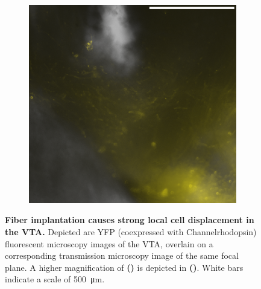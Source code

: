 \begin{figure}[h!]
	\begin{subfigure}{.2728\textwidth}
		\centering
		\includegraphics[width=\textwidth]{img/sub-6589_slice-a4_zoom-10_scene-2_transmission-yfp-comb_straight.png}
                \caption{}
		\label{fig:h6589z}
	\end{subfigure}
        \vspace{-.5em}
	\caption{
		\textbf{Fiber implantation causes strong local cell displacement in the VTA.}
                Depicted are YFP (coexpressed with Channelrhodopsin) fluorescent microscopy images of the VTA, overlain on a corresponding transmission microscopy image of the same focal plane.
                A higher magnification of \textbf{()} is depicted in \textbf{()}.
                White bars indicate a scale of \SI{500}{\micro\meter}.
                }
	\label{fig:h}
\end{figure}
